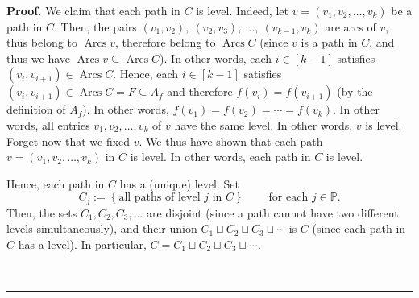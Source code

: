 \documentclass[numbers=enddot,12pt,final,onecolumn,notitlepage]{scrartcl}%
\numberwithin{exer}{section}
\theoremstyle{definition}
\newenvironment{proof}[1][Proof]{\noindent\textbf{#1.} }{\ \rule{0.5em}{0.5em}}
\newenvironment{verlong}{}{}
\begin{document}
\begin{verlong}
\begin{proof}
We claim that each path in $C$ is level. Indeed, let $v=\left(  v_{1}%
,v_{2},\ldots,v_{k}\right)  $ be a path in $C$. Then, the pairs $\left(
v_{1},v_{2}\right)  ,\ \left(  v_{2},v_{3}\right)  ,\ \ldots,\ \left(
v_{k-1},v_{k}\right)  $ are arcs of $v$, thus belong to $\operatorname*{Arcs}%
v$, therefore belong to $\operatorname*{Arcs}C$ (since $v$ is a path in $C$,
and thus we have $\operatorname*{Arcs}v\subseteq\operatorname*{Arcs}C$). In
other words, each $i\in\left[  k-1\right]  $ satisfies $\left(  v_{i}%
,v_{i+1}\right)  \in\operatorname*{Arcs}C$. Hence, each $i\in\left[
k-1\right]  $ satisfies $\left(  v_{i},v_{i+1}\right)  \in\operatorname*{Arcs}%
C=F\subseteq A_{f}$ and therefore $f\left(  v_{i}\right)  =f\left(
v_{i+1}\right)  $ (by the definition of $A_{f}$). In other words, $f\left(
v_{1}\right)  =f\left(  v_{2}\right)  =\cdots=f\left(  v_{k}\right)  $. In
other words, all entries $v_{1},v_{2},\ldots,v_{k}$ of $v$ have the same
level. In other words, $v$ is level. Forget now that we fixed $v$. We thus
have shown that each path $v=\left(  v_{1},v_{2},\ldots,v_{k}\right)  $ in $C$
is level. In other words, each path in $C$ is level.

Hence, each path in $C$ has a (unique) level. Set%
\[
C_{j}:=\left\{  \text{all paths of level }j\text{ in }C\right\}
\ \ \ \ \ \ \ \ \ \ \text{for each }j\in\mathbb{P}.
\]
Then, the sets $C_{1},C_{2},C_{3},\ldots$ are disjoint (since a path cannot
have two different levels simultaneously), and their union $C_{1}\sqcup
C_{2}\sqcup C_{3}\sqcup\cdots$ is $C$ (since each path in $C$ has a level). In
particular, $C=C_{1}\sqcup C_{2}\sqcup C_{3}\sqcup\cdots$.


\end{proof}
\end{verlong}
\end{document}
